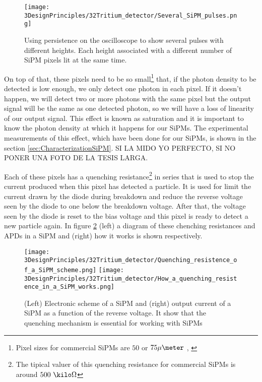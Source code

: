 \begin{figure}[htbp]
\centering
\texttt{[image: 3DesignPrinciples/32Tritium\_detector/Several\_SiPM\_pulses.png]}
\caption{Using persistence on the oscilloscope to show several pulses with different heights. Each height associated with a different number of  SiPM pixels lit at the same time.\label{fig:PulsesOfSiPM}}
\end{figure}

On top of that, these pixels need to be so small\footnote{Pixel sizes for commercial SiPMs are $50$ or $75\mu\meter$ \cite{DataSheetHammamatsu_1_SiPM_50}, \cite{DataSheetHammamatsu_1_SiPM_75}} that, if the photon density to be detected is low enough, we only detect one photon in each pixel. If it doesn't happen, we will detect two or more photons with the same pixel but the output signal will be the same as one detected photon, so we will have a loss of linearity of our output signal. This effect is known as saturation and it is important to know the photon density at which it happens for our SiPMs. The experimental measurements of this effect, which have been done for our SiPMs, is shown in the section \ref{sec:CharacterizationSiPM}. SI LA MIDO YO PERFECTO, SI NO PONER UNA FOTO DE LA TESIS LARGA.

Each of these pixels has a quenching resistance\footnote{The tipical valuer of this quenching resistance for commercial SiPMs is around $500~\kilo\Omega$} in series that is used to stop the current produced when this pixel has detected a particle. It is used for limit the current drawn by the diode during breakdown and reduce the reverse voltage seen by the diode to one below the breakdown voltage. After that, the voltage seen by the diode is reset to the bias voltage and this pixel is ready to detect a new particle again. In figure \ref{fig:ChenchingResistance} (left) a diagram of these chenching resistances and APDs in a SiPM and (right) how it works is shown respectively.

\begin{figure}[htbp]
\centering
{
\texttt{[image: 3DesignPrinciples/32Tritium\_detector/Quenching\_resistence\_of\_a\_SiPM\_scheme.png]}
}
{
\texttt{[image: 3DesignPrinciples/32Tritium\_detector/How\_a\_quenching\_resistence\_in\_a\_SiPM\_works.png]}
}
\caption{(Left) Electronic scheme of a SiPM and (right) output current of a SiPM as a function of the reverse voltage. It show that the quenching mechanism is essential for working with SiPMs\label{fig:ChenchingResistance}~\cite{DataSheetSensL}}
\end{figure}

